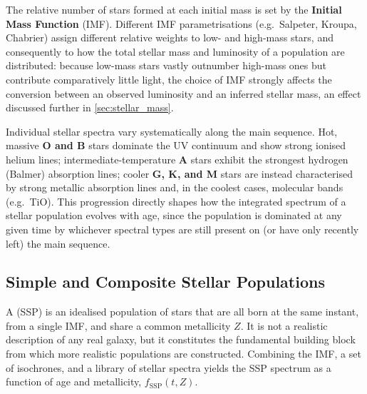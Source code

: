 \medskip

The relative number of stars formed at each initial mass is set by the \textbf{Initial Mass Function} (IMF). Different IMF parametrisations (e.g.\ Salpeter, Kroupa, Chabrier) assign different relative weights to low- and high-mass stars, and consequently to how the total stellar mass and luminosity of a population are distributed: because low-mass stars vastly outnumber high-mass ones but contribute comparatively little light, the choice of IMF strongly affects the conversion between an observed luminosity and an inferred stellar mass, an effect discussed further in \cref{sec:stellar_mass}.

\medskip

Individual stellar spectra vary systematically along the main sequence. Hot, massive \textbf{O and B} stars dominate the UV continuum and show strong ionised helium lines; intermediate-temperature \textbf{A} stars exhibit the strongest hydrogen (Balmer) absorption lines; cooler \textbf{G, K, and M} stars are instead characterised by strong metallic absorption lines and, in the coolest cases, molecular bands (e.g.\ TiO). This progression directly shapes how the integrated spectrum of a stellar population evolves with age, since the population is dominated at any given time by whichever spectral types are still present on (or have only recently left) the main sequence.

\subsection{Simple and Composite Stellar Populations} \label{subsec:ssp_csp}

\begin{definitionblock}
A  (SSP) is an idealised population of stars that are all born at the same instant, from a single IMF, and share a common metallicity $Z$. It is not a realistic description of any real galaxy, but it constitutes the fundamental building block from which more realistic populations are constructed. Combining the IMF, a set of isochrones, and a library of stellar spectra yields the SSP spectrum as a function of age and metallicity, $f_{\text{SSP}}(t, Z)$.
\end{definitionblock}

